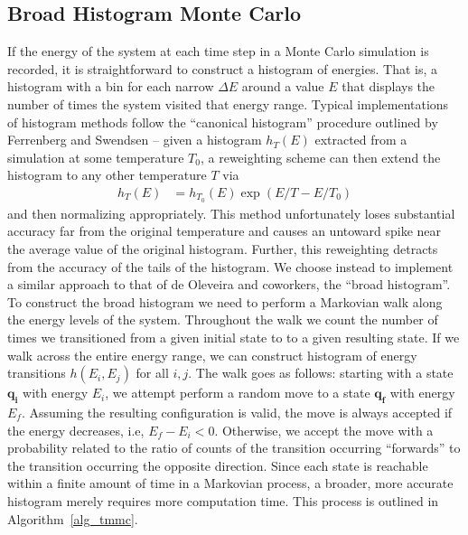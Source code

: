 \documentclass[12pt]{article}
\begin{document}
\subsection{Broad Histogram Monte Carlo}
If the energy of the system at each time step in a Monte Carlo simulation is recorded, it is straightforward to construct a histogram of energies. That is, a histogram with a bin for each narrow $\Delta E$ around a value $E$ that displays the number of times the system visited that energy range. Typical implementations of histogram methods follow the ``canonical histogram'' procedure outlined by Ferrenberg and Swendsen \cite{ferrenberg1988histogram} -- given a histogram $h_T(E)$ extracted from a simulation at some temperature $T_0$, a reweighting scheme can then extend the histogram to any other temperature $T$ via 
\begin{align}
    h_{T}(E) &= h_{T_0}(E) \exp\left(E/T - E/T_0 \right)
\end{align}
and then normalizing appropriately. This method unfortunately loses substantial accuracy far from the original temperature and causes an untoward spike near the average value of the original histogram. Further, this reweighting detracts from the accuracy of the tails of the histogram. We choose instead to implement a similar approach to that of de Oleveira and coworkers\cite{de1998broad}, the ``broad histogram''. \\

To construct the broad histogram we need to perform a Markovian walk along the energy levels of the system. Throughout the walk we count the number of times we transitioned from a given initial state to to a given resulting state. If we walk across the entire energy range, we can construct histogram of energy transitions $h(E_i, E_j)$ for all $i, j$. The walk goes as follows: starting with a state $\mathbf{q_i}$ with energy $E_i$, we attempt perform a random move to a state $\mathbf{q_f}$ with energy $E_f$. Assuming the resulting configuration is valid, the move is always accepted if the energy decreases, i.e, $E_f - E_i <0$. Otherwise, we accept the move with a probability related to the ratio of counts of the transition occurring ``forwards'' to the transition occurring the opposite direction. Since each state is reachable within a finite amount of time in a Markovian process, a broader, more accurate histogram merely requires more computation time. This process is outlined in Algorithm~\ref{alg_tmmc}.\\
\end{document}
